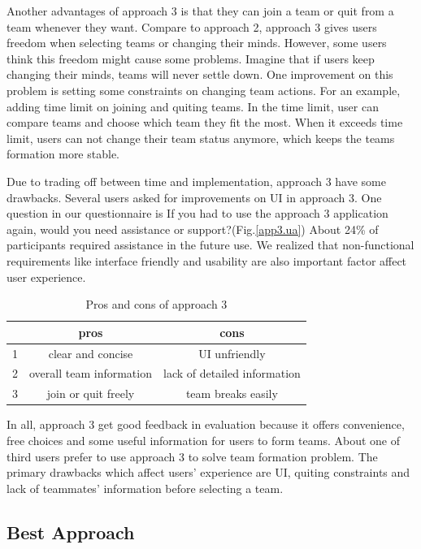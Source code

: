\documentclass[conference]{IEEEtran}
\begin{document}
Another advantages of approach 3 is that they can join a team or quit from a team whenever they want. Compare to approach 2, approach 3 gives users freedom when selecting teams or changing their minds. However, some users think this freedom might cause some problems. Imagine that if users keep changing their minds, teams will never settle down. One improvement on this problem is setting some constraints on changing team actions. For an example, adding time limit on joining and quiting teams. In the time limit, user can compare teams and choose which team they fit the most. When it exceeds time limit, users can not change their team status anymore, which keeps the teams formation more stable.

Due to trading off between time and implementation, approach 3 have some drawbacks. Several users asked for improvements on UI in approach 3. One question in our questionnaire is If you had to use the approach 3 application again, would you need assistance or support?(Fig.\ref{app3.ua}) About 24\% of participants required assistance in the future use. We realized that non-functional requirements like interface friendly and usability are also important factor affect user experience.

 \begin{table}[!htb]\centering
 \begin{tabular} { | c | c |  c |}
 \hline
&pros & cons\\
 \hline
1& clear and concise & UI unfriendly\\
 \hline
2& overall team information & lack of detailed information\\
 \hline
3&join or quit freely & team breaks easily\\
 \hline
 \end{tabular}
 \caption{Pros and cons of approach 3}
 \end{table}

In all, approach 3 get good feedback in evaluation because it offers convenience, free choices and some useful information for users to form teams. About one of third users prefer to use approach 3 to solve team formation problem. The primary drawbacks which affect users' experience are UI, quiting constraints and lack of teammates' information before selecting a team. 


\subsection{Best Approach}
\blindtext
\end{document}
